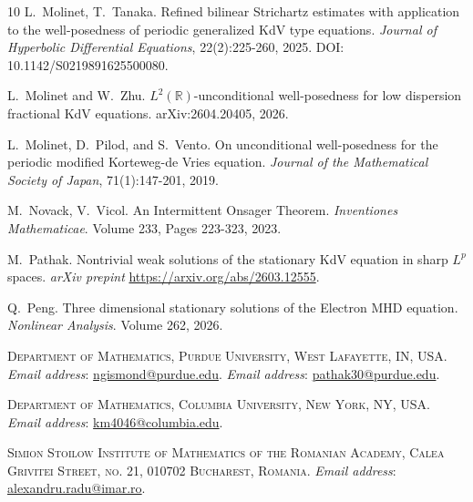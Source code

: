 \documentclass[12pt,reqno,letterpaper]{amsart}
\numberwithin{equation}{section}
\newcommand{\1}{{\bf 1}}
\newcommand{\2}{{\bf 2}}
\theoremstyle{remark}
\theoremstyle{remark}
\begin{document}
\begin{thebibliography}{10}
    L.~Molinet, T.~Tanaka.
    \newblock Refined bilinear Strichartz estimates with application to the
    well-posedness of periodic generalized KdV type equations.
    \newblock \emph{Journal of Hyperbolic Differential Equations}, 22(2):225-260,
    2025.
    \newblock DOI: 10.1142/S0219891625500080.

    L.~Molinet and W.~Zhu.
    \newblock $L^2(\mathbb R)$-unconditional well-posedness for low dispersion
    fractional KdV equations.
    \newblock arXiv:2604.20405, 2026.

    L.~Molinet, D.~Pilod, and S.~Vento.
    \newblock On unconditional well-posedness for the periodic modified
    Korteweg-de Vries equation.
    \newblock \emph{Journal of the Mathematical Society of Japan}, 71(1):147-201,
    2019.

    M.~Novack, V.~Vicol.
    \newblock An Intermittent Onsager Theorem.
    \newblock \emph{Inventiones Mathematicae}. Volume 233, Pages 223-323, 2023.

    M.~Pathak.
    \newblock Nontrivial weak solutions of the stationary KdV equation in sharp $L^p$ spaces.
    \newblock \emph{arXiv prepint} \url{https://arxiv.org/abs/2603.12555}.

    Q.~Peng.
    \newblock Three dimensional stationary solutions of the Electron MHD equation.
    \newblock \emph{Nonlinear Analysis}. Volume 262, 2026.

\end{thebibliography}

\noindent\textsc{Department of Mathematics, Purdue University, West Lafayette, IN, USA.}
\vspace{.03in}
\newline\noindent\textit{Email address}:
\href{mailto:ngismond@purdue.edu}{ngismond@purdue.edu}.
\newline\noindent\textit{Email address}:
\href{mailto:pathak30@purdue.edu}{pathak30@purdue.edu}.

\noindent\textsc{Department of Mathematics, Columbia University, New York, NY, USA.}
\vspace{.03in}
\newline\noindent\textit{Email address}:
\href{mailto:km4046@columbia.edu}{km4046@columbia.edu}.

\noindent\textsc{Simion Stoilow Institute of Mathematics of the Romanian Academy, Calea Grivitei Street, no. 21, 010702 Bucharest, Romania.}
\newline\noindent\textit{Email address}: \href{mailto:alexandru.radu@imar.ro}{alexandru.radu@imar.ro}.
\end{document}
